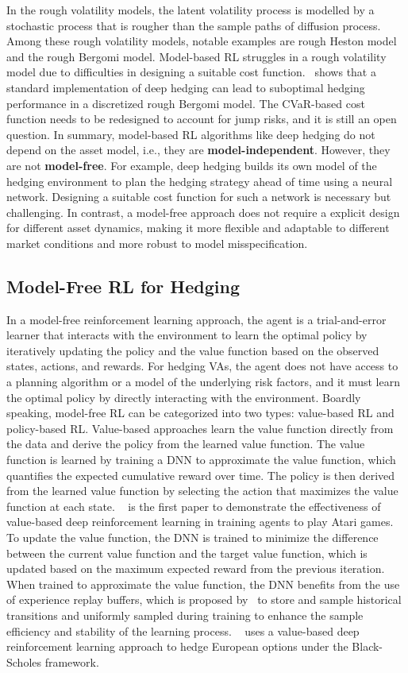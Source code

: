 In the rough volatility models, the latent volatility process is modelled by a stochastic process that is rougher than the sample paths of diffusion process. 
Among these rough volatility models, notable examples are rough Heston model and the rough Bergomi model. 
Model-based RL struggles in a rough volatility model due to difficulties in designing a suitable cost function.~\cite{horvath2021deep} shows that a standard implementation of deep hedging can lead to suboptimal hedging performance in a discretized rough Bergomi model. 
The CVaR-based cost function needs to be redesigned to account for jump risks, and it is still an open question.
In summary, model-based RL algorithms like deep hedging do not depend on the asset model, i.e., they are \textbf{model-independent}.
However, they are not \textbf{model-free}.
For example, deep hedging builds its own model of the hedging environment to plan the hedging strategy ahead of time using a neural network.
Designing a suitable cost function for such a network is necessary but challenging.
In contrast, a model-free approach does not require a explicit design for different asset dynamics, making it more flexible and adaptable to different market conditions and more robust to model misspecification.

\subsection{Model-Free RL for Hedging}
    
In a model-free reinforcement learning approach, the agent is a trial-and-error learner that interacts with the environment to learn the optimal policy by iteratively updating the policy and the value function based on the observed states, actions, and rewards.
For hedging VAs, the agent does not have access to a planning algorithm or a model of the underlying risk factors, and it must learn the optimal policy by directly interacting with the environment.
Boardly speaking, model-free RL can be categorized into two types: value-based RL and policy-based RL.
Value-based approaches learn the value function directly from the data and derive the policy from the learned value function. 
The value function is learned by training a DNN to approximate the value function, which quantifies the expected cumulative reward over time. 
The policy is then derived from the learned value function by selecting the action that maximizes the value function at each state. 
~\cite{mnih2015human} is the first paper to demonstrate the effectiveness of value-based deep reinforcement learning in training agents to play Atari games.
To update the value function, the DNN is trained to minimize the difference between the current value function and the target value function, which is updated based on the maximum expected reward from the previous iteration.
When trained to approximate the value function, the DNN benefits from the use of experience replay buffers, which is proposed by~\cite{lin1992self} to store and sample historical transitions and uniformly sampled during training to enhance the sample efficiency and stability of the learning process.
~\cite{kolm2019dynamic} uses a value-based deep reinforcement learning approach to hedge European options under the Black-Scholes framework.

